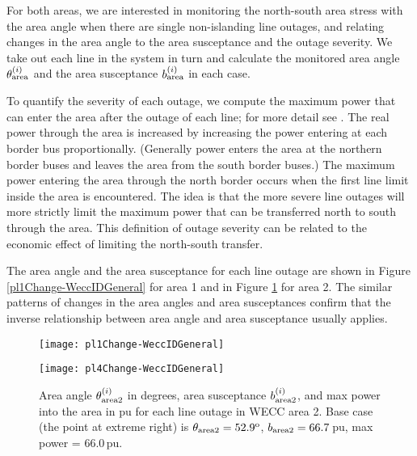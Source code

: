 \documentclass[conference]{IEEEtran}
\begin{document}
 For both areas, we are interested in monitoring the north-south area stress with the area angle
when there are single non-islanding line outages, and relating changes in the area angle to the area 
susceptance and the outage severity.
We take out each line in the system in turn and calculate  the monitored area angle $\theta_{\rm area}^{(i)}$ and the area susceptance $b_{\rm area}^{(i)}$ in each case.


To quantify the severity of each outage, we compute the maximum power that can enter the area after the outage of each line; for more detail see
\cite{DarvishiNAPS13}. 
The real power through the area is increased by increasing the power entering at each border bus proportionally.
(Generally power enters the area at the northern border buses and leaves the area from the south border buses.)
The maximum power entering the area through the north border occurs when the first line limit inside the area is encountered.
The idea is that the more severe line outages will more strictly limit the maximum power that 
can be transferred north to south through the area. This definition of outage severity can be related to the economic effect 
of limiting the north-south transfer.

  The area angle and the area susceptance for each line outage are shown in Figure \ref{pl1Change-WeccIDGeneral} for area 1 and in Figure \ref{pl4Change-WeccIDGeneral} for area 2. 
    The similar patterns of changes in the area angles and area susceptances confirm that the inverse relationship between area angle and area susceptance usually applies. 

  
  \begin{figure}[h]
  \begin{center}
  \texttt{[image: pl1Change-WeccIDGeneral]}
  \vspace{-25pt}
   \caption{Area angle $\theta_{\rm area1}^{(i)}$ in degrees, area susceptance $b_{\rm area1}^{(i)}$ , and maximum power into the area in pu for each line outage in WECC area 1. Base case (the point at extreme right) is $\theta_{\rm area1}=66.5^{\rm o}$, $b_{\rm area1}=39.0\,$pu, max power  = 46.9.
   For clarity, graph shows $b_{\rm area}$ multiplied by 2, and max power  multiplied by 1.5.}
  \label{pl1Change-WeccIDGeneral}
  \end{center}
\begin{center}
  \texttt{[image: pl4Change-WeccIDGeneral]}
  \vspace{-25pt}
   \caption{Area angle $\theta_{\rm area2}^{(i)}$ in degrees, area susceptance $b_{\rm area2}^{(i)}$, and max power into the area in pu for each line outage in WECC area 2. Base case (the point at extreme right) is $\theta_{\rm area2}=52.9^{\rm o}$, $b_{\rm area2}=66.7\,$pu, max power  = 66.0\,pu.}  \label{pl4Change-WeccIDGeneral}
  \end{center}
  \end{figure} 
  
\end{document}
